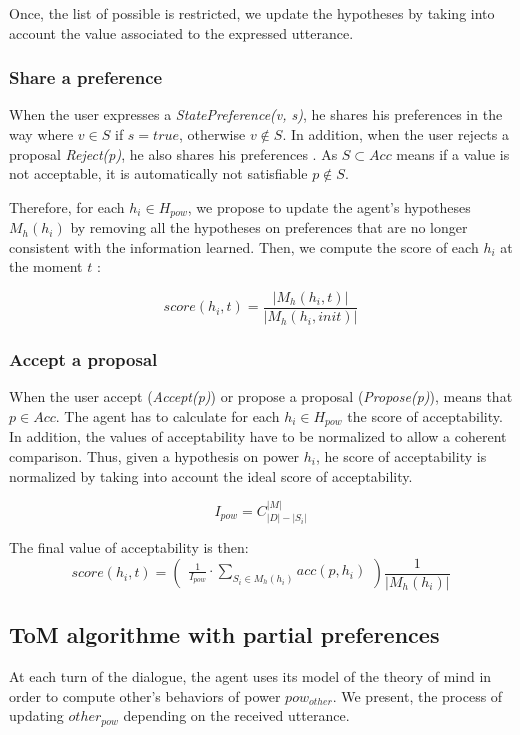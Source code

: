\documentclass[conference, letterpaper]{IEEEtran}
\begin{document}
	Once, the list of possible is restricted, we update the hypotheses by taking into account the value associated to the expressed utterance.
	
	\subsubsection{Share a preference}
	When the user expresses a \emph{StatePreference(v, s)}, he shares his preferences in the way where $v \in S$ if $s =true$, otherwise $v \notin S$. 
	In addition, when the user rejects a proposal \emph{Reject(p)}, he also shares his preferences . As $S \subset Acc$ means if a value is not acceptable, it is automatically not satisfiable $p \notin S$. 
	
	Therefore, for each  $h_i \in H_{pow}$, we propose to update the agent's hypotheses $M_h(h_i)$ by removing all the hypotheses on preferences that are no longer consistent with the information learned. 
	Then, we compute the score of each $h_i$ at the moment $t$ :
	
	$$score(h_i,t) = \frac{|M_h(h_i, t)|}{|M_h(h_i, init)|}$$
	
	
	\subsubsection{Accept a proposal}
	When the user accept (\emph{Accept(p)}) or propose a proposal (\emph{Propose(p)}), means that $p \in Acc$. 
	The agent has to calculate for each $h_i \in H_{pow}$ the score of acceptability. In addition, the values of acceptability have to be normalized to allow a coherent comparison. Thus, given a hypothesis on power $h_i$, he score of acceptability is normalized by taking into account the ideal score of acceptability.
	
	$$I_{pow} =  C_{|D|-|S_i|}^{|M|}$$
	
	
	The final value of acceptability is then:
	\begin{equation}
	score(h_i, t)= \left( \begin{array}{c}  \frac{1}{I_{pow}} \cdot \sum_{S_i \in M_h(h_i) } acc(p, h_i) 
	\end{array}\right) \frac{1}{| M_h(h_i)|}
	\end{equation}
	
	\subsection{ToM algorithme with partial preferences}
	At each turn of the dialogue, the agent uses its model of the theory of mind in order to compute other's behaviors of power $pow_{other}$. We present, the process of updating $other_{pow}$ depending on the received utterance. 
	
\end{document}
